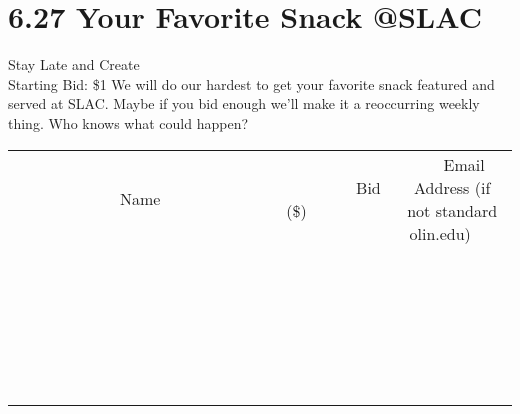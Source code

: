 \documentclass[11pt]{article}
\begin{document}
\section*{6.27 Your Favorite Snack @SLAC}
Stay Late and Create
\\
Starting Bid: \$1
\newline
We will do our hardest to get your favorite snack featured and served at SLAC. Maybe if you bid enough we'll make it a reoccurring weekly thing. Who knows what could happen?
\\[6ex]
\begin{tabular}{c c c}
~~~~~~~~~~~~~Name~~~~~~~~~~~~~ & ~~~~~~~~~Bid (\$)~~~~~~~~~  & ~~~Email Address (if not standard olin.edu)~~~\\
 & & \\
\hline
 & & \\
\hline
 & & \\
\hline
 & & \\
\hline
 & & \\
\hline
 & & \\
\hline
 & & \\
\hline
 & & \\
\hline
 & & \\
\hline
 & & \\
\hline
 & & \\
\hline
 & & \\
\hline
 & & \\
\hline
 & & \\
\hline
 & & \\
\hline
 & & \\
\hline
 & & \\
\hline
 & & \\
\hline
 & & \\
\hline
 & & \\
\hline
 & & \\
\hline
 & & \\
\hline
 & & \\
\hline
 & & \\
\hline
 & & \\
\hline
 & & \\
\hline
\end{tabular}
\newpage
\end{document}
